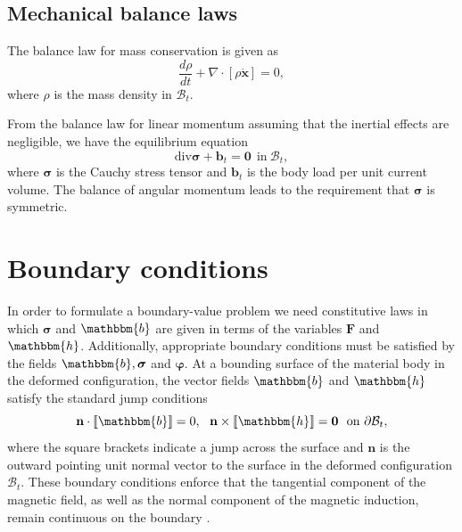 \documentclass[11pt,a4paper,final]{article}
\begin{document}
\subsection{Mechanical balance laws}
The balance law for mass conservation is given as 
\begin{equation}
\frac{d\rho}{dt} + \nabla \cdot [\rho \mathbf{\dot{x}}] = 0,
\end{equation}
where $\rho$ is the mass density in $\mathcal{B}_t$. \par 
From the balance law for linear momentum assuming that the inertial effects are negligible, we have the equilibrium equation 
\begin{equation}
\text{div} \bm{\sigma} + \bm{b}_t = \mathbf{0} \ \ \text{in} \ \mathcal{B}_t,
\end{equation}
where $\bm{\sigma}$ is the Cauchy stress tensor and $\bm{b}_t$ is the body load per unit current volume. The balance of angular momentum leads to the requirement that $\bm{\sigma}$ is symmetric. 

\section{Boundary conditions}
In order to formulate a boundary-value problem we need constitutive laws in which $\bm{\sigma}$ and $\mathbbm{b}$ are given in terms of the variables $\mathbf{F}$ and $\mathbbm{h}$. Additionally, appropriate boundary conditions must be satisfied by the fields $\mathbbm{b}, \bm{\sigma}$ and $\bm{\varphi}$. At a bounding surface of the material body in the deformed configuration, the vector fields $\mathbbm{b}$ and $\mathbbm{h}$ satisfy the standard jump conditions
\begin{equation}
\mathbf{n} \cdot \llbracket \mathbbm{b} \rrbracket = 0, \ \ \mathbf{n} \times \llbracket \mathbbm{h} \rrbracket = \mathbf{0} \ \ \text{on} \ \partial\mathcal{B}_t,
\label{eq:1.4}
\end{equation}
where the square brackets indicate a jump across the surface and $\mathbf{n}$ is the outward pointing unit normal vector to the surface in the deformed configuration $\mathcal{B}_t$. These boundary conditions enforce that the tangential component of the magnetic field, as well as the normal component of the magnetic induction, remain continuous on the boundary \cite{pelteret2016}.
\end{document}
